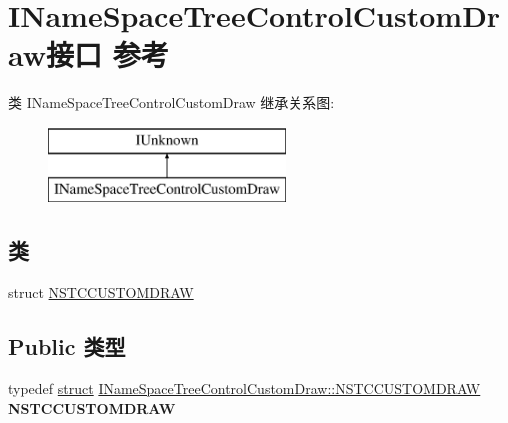 \hypertarget{interface_i_name_space_tree_control_custom_draw}{}\section{I\+Name\+Space\+Tree\+Control\+Custom\+Draw接口 参考}
\label{interface_i_name_space_tree_control_custom_draw}
类 I\+Name\+Space\+Tree\+Control\+Custom\+Draw 继承关系图\+:\begin{figure}[H]
\begin{center}
\leavevmode
\includegraphics[height=2.000000cm]{interface_i_name_space_tree_control_custom_draw}
\end{center}
\end{figure}
\subsection*{类}
\begin{DoxyCompactItemize}
\item 
struct \hyperlink{struct_i_name_space_tree_control_custom_draw_1_1_n_s_t_c_c_u_s_t_o_m_d_r_a_w}{N\+S\+T\+C\+C\+U\+S\+T\+O\+M\+D\+R\+AW}
\end{DoxyCompactItemize}
\subsection*{Public 类型}
\begin{DoxyCompactItemize}
\item 
\mbox{\label{interface_i_name_space_tree_control_custom_draw_a47aa591308dc7a7e8d0d3c9e77589f41}} 
typedef \hyperlink{interfacestruct}{struct} \hyperlink{struct_i_name_space_tree_control_custom_draw_1_1_n_s_t_c_c_u_s_t_o_m_d_r_a_w}{I\+Name\+Space\+Tree\+Control\+Custom\+Draw\+::\+N\+S\+T\+C\+C\+U\+S\+T\+O\+M\+D\+R\+AW} {\bfseries N\+S\+T\+C\+C\+U\+S\+T\+O\+M\+D\+R\+AW}
\end{DoxyCompactItemize}
